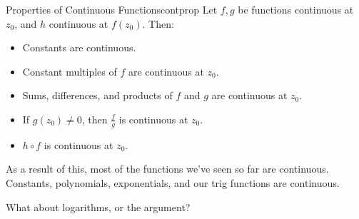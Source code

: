 \begin{thmbo}{Properties of Continuous Functions}{contprop}
Let $f,g$ be functions continuous at $z_0$, and $h$ continuous at $f(z_0)$. Then:

\begin{itemize}
\item Constants are continuous.
\item Constant multiples of $f$ are continuous at $z_0$.
\item Sums, differences, and products of $f$ and $g$ are continuous at $z_0$.
\item If $g(z_0)\ne 0$, then $\frac{f}{g}$ is continuous at $z_0$.
\item $h\circ f$ is continuous at $z_0$.
\end{itemize}
\end{thmbo}

As a result of this, most of the functions we've seen so far are continuous. Constants, polynomials, exponentials, and our trig functions are continuous.

What about logarithms, or the argument?

